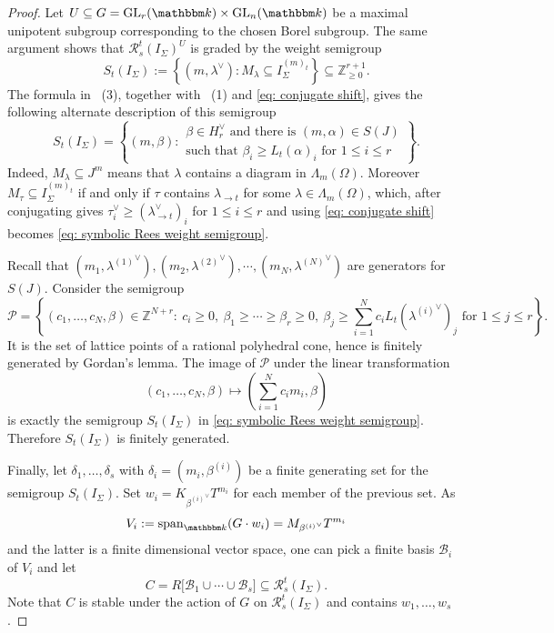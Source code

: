 \documentclass[11pt, reqno]{amsart}
\numberwithin{equation}{section}
\theoremstyle{definition}
\DeclareMathOperator{\GL}{GL}
\newcommand{\ZZ}{{\mathbb Z}}
\newcommand{\kk}{{\mathbbm k}}
\renewcommand{\l}{\lambda}
\begin{document}
\begin{proof}
Let  $U\subseteq G=\GL_r(\kk)\times\GL_n(\kk)$ be a maximal unipotent subgroup corresponding to the chosen Borel subgroup.
The same argument shows that $\mathcal R_s^t(I_\Sigma)^{U}$
is graded by the weight semigroup  \[
S_t(I_\Sigma):=\left\{(m,\lambda^\vee): M_\lambda \subseteq I_\Sigma^{(m)_t}\right\} \subseteq \ZZ_{\geq 0}^{r+1}.
\]
The formula in ~(3), together with ~(1) and \eqref{eq: conjugate shift}, gives the following alternate description of this semigroup
\begin{equation}\label{eq: symbolic Rees weight semigroup}
S_t(I_\Sigma)
=\left\{(m,\beta):
\begin{array}{l}
\beta\in H_r^\vee \text{ and there is }(m,\alpha)\in S(J)\\[-2pt]
\text{such that }\beta_i\geq L_t(\alpha)_i\text{ for }1\leq i\leq r
\end{array}
\right\}.
\end{equation}
Indeed, $M_\lambda \subseteq J^m$ means that $\lambda$ contains a diagram in $\Lambda_m(\Omega)$. Moreover  $M_\tau \subseteq I_\Sigma^{(m)_t}$ if and only if $\tau$ contains $\lambda_{\rightarrow t}$ for some  $\lambda \in \Lambda_m(\Omega)$, which, after conjugating gives $\tau^\vee_i\geq (\l_{\rightarrow t}^\vee)_i$ for $1\leq i\leq r$  and using \eqref{eq: conjugate shift} becomes  \eqref{eq: symbolic Rees weight semigroup}.

Recall that $(m_1,{\l^{(1)}}^\vee), (m_2,{\l^{(2)}}^\vee), \cdots, (m_N,{\l^{(N)}}^\vee)$ are generators for $S(J)$. Consider the semigroup
\[
\mathcal{P}=\left\{ (c_1,\ldots,c_N,\beta)\in \ZZ^{N+r} : \
c_i\geq0, \ \beta_1\geq\cdots\geq\beta_r\geq0, \
\beta_j\geq\sum_{i=1}^N c_iL_t({\l^{(i)}}^\vee)_j \text{ for }1\leq j\leq r \right \}.
\]
It is the set of lattice points of a rational polyhedral cone, hence is finitely generated by Gordan's lemma. The image of $\mathcal{P}$ under the linear transformation
\[
(c_1,\ldots,c_N,\beta)
\longmapsto
\left(\sum_{i=1}^Nc_im_i,\beta\right)
\]
is exactly the semigroup $S_t(I_\Sigma)$ in \eqref{eq: symbolic Rees weight semigroup}. Therefore $S_t(I_\Sigma)$ is finitely generated.

Finally, let $\delta_1,\ldots,\delta_s$ with $\delta_i=(m_i,\beta^{(i)})$ be a finite generating set for the semigroup $S_t(I_\Sigma)$.  Set  $w_i=K_{{\beta^{(i)}}^\vee}T^{m_i}$ for each member of the previous set. As
\[
V_i:=\operatorname{span}_{\kk}(G\cdot w_i)= M_{{\beta^{(i)}}^\vee}T^{m_i}
\]
and the latter is a finite dimensional vector space, one can pick a finite basis $\mathcal B_i$ of $V_i$ and let
\[ C = R\bigl[\mathcal B_1\cup\cdots\cup\mathcal B_s\bigr] \subseteq \mathcal R_s^t(I_\Sigma). \]
Note that $C$ is stable under the action of $G$ on $\mathcal R_s^t(I_\Sigma)$ and contains $w_1, \ldots, w_s$.


\end{proof}
\end{document}
